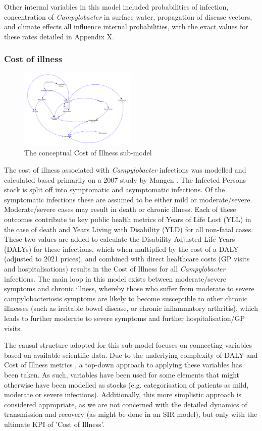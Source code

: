 Other internal variables in this model included probabilities of infection, concentration of \textit{Campylobacter} in surface water, propagation of disease vectors, and climate effects all influence internal probabilities, with the exact values for these rates detailed in Appendix X.


\subsubsection*{Cost of illness}
\begin{figure}[h]
\centering
\includegraphics[width=0.5\textwidth]{images/COI_submodel.png}
\caption{The conceptual Cost of Illness sub-model}
\end{figure}
The cost of illness associated with \textit{Campylobacter} infections was modelled and calculated based primarily on a 2007 study by Mangen \parencite{mangen_campylobacteriosis_2007}. The Infected Persons stock is split off into symptomatic and asymptomatic infections. Of the symptomatic infections these are assumed to be either mild or moderate/severe. Moderate/severe cases may result in death or chronic illness. Each of these outcomes contribute to key public health metrics of Years of Life Lost (YLL) in the case of death and Years Living with Disability (YLD) for all non-fatal cases. These two values are added to calculate the Disability Adjusted Life Years (DALYs) for these infections, which when multiplied by the cost of a DALY (adjusted to 2021 prices), and combined with direct healthcare costs (GP visits and hospitalisations) results in the Cost of Illness for all \textit{Campylobacter} infections. The main loop in this model exists between moderate/severe symptoms and chronic illness, whereby those who suffer from moderate to severe campylobacteriosis symptoms are likely to become susceptible to other chronic illnesses (such as irritable bowel disease, or chronic inflammatory arthritis), which leads to further moderate to severe symptoms and further hospitalisation/GP visits.

The causal structure adopted for this sub-model focuses on connecting variables based on available scientific data. Due to the underlying complexity of DALY and Cost of Illness metrics \parencite{jo_cost--illness_2014}, a top-down approach to applying these variables has been taken. As such, variables have been used for some elements that might otherwise have been modelled as stocks (e.g. categorisation of patients as mild, moderate or severe infections). Additionally, this more simplistic approach is considered appropriate, as we are not concerned with the detailed dynamics of transmission and recovery (as might be done in an SIR model), but only with the ultimate KPI of 'Cost of Illness'.

